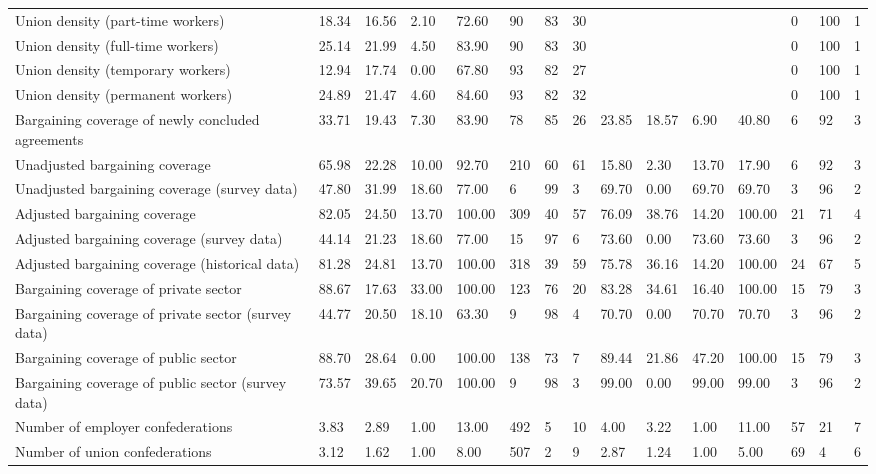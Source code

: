 \begin{longtable}{lllllllllllllll}
Union density (part-time workers) & 18.34 & 16.56 & 2.10 & 72.60 & 90 & 83 & 30 &  &  &  &  & 0 & 100 & 1\\
Union density (full-time workers) & 25.14 & 21.99 & 4.50 & 83.90 & 90 & 83 & 30 &  &  &  &  & 0 & 100 & 1\\
Union density (temporary workers) & 12.94 & 17.74 & 0.00 & 67.80 & 93 & 82 & 27 &  &  &  &  & 0 & 100 & 1\\
\addlinespace
Union density (permanent workers) & 24.89 & 21.47 & 4.60 & 84.60 & 93 & 82 & 32 &  &  &  &  & 0 & 100 & 1\\
Bargaining coverage of newly concluded agreements & 33.71 & 19.43 & 7.30 & 83.90 & 78 & 85 & 26 & 23.85 & 18.57 & 6.90 & 40.80 & 6 & 92 & 3\\
Unadjusted bargaining coverage & 65.98 & 22.28 & 10.00 & 92.70 & 210 & 60 & 61 & 15.80 & 2.30 & 13.70 & 17.90 & 6 & 92 & 3\\
Unadjusted bargaining coverage (survey data) & 47.80 & 31.99 & 18.60 & 77.00 & 6 & 99 & 3 & 69.70 & 0.00 & 69.70 & 69.70 & 3 & 96 & 2\\
Adjusted bargaining coverage & 82.05 & 24.50 & 13.70 & 100.00 & 309 & 40 & 57 & 76.09 & 38.76 & 14.20 & 100.00 & 21 & 71 & 4\\
\addlinespace
Adjusted bargaining coverage (survey data) & 44.14 & 21.23 & 18.60 & 77.00 & 15 & 97 & 6 & 73.60 & 0.00 & 73.60 & 73.60 & 3 & 96 & 2\\
Adjusted bargaining coverage (historical data) & 81.28 & 24.81 & 13.70 & 100.00 & 318 & 39 & 59 & 75.78 & 36.16 & 14.20 & 100.00 & 24 & 67 & 5\\
Bargaining coverage of private sector & 88.67 & 17.63 & 33.00 & 100.00 & 123 & 76 & 20 & 83.28 & 34.61 & 16.40 & 100.00 & 15 & 79 & 3\\
Bargaining coverage of private sector (survey data) & 44.77 & 20.50 & 18.10 & 63.30 & 9 & 98 & 4 & 70.70 & 0.00 & 70.70 & 70.70 & 3 & 96 & 2\\
Bargaining coverage of public sector & 88.70 & 28.64 & 0.00 & 100.00 & 138 & 73 & 7 & 89.44 & 21.86 & 47.20 & 100.00 & 15 & 79 & 3\\
\addlinespace
Bargaining coverage of public sector (survey data) & 73.57 & 39.65 & 20.70 & 100.00 & 9 & 98 & 3 & 99.00 & 0.00 & 99.00 & 99.00 & 3 & 96 & 2\\
Number of employer confederations & 3.83 & 2.89 & 1.00 & 13.00 & 492 & 5 & 10 & 4.00 & 3.22 & 1.00 & 11.00 & 57 & 21 & 7\\
Number of union confederations & 3.12 & 1.62 & 1.00 & 8.00 & 507 & 2 & 9 & 2.87 & 1.24 & 1.00 & 5.00 & 69 & 4 & 6\\

\end{longtable}
